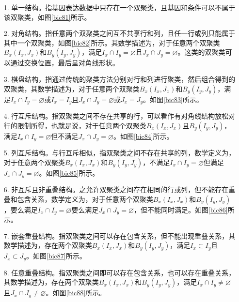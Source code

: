   \begin{enumerate}
    \item[1.] 单一结构。指基因表达数据中只存在一个双聚类，且基因和条件可以不属于该双聚类，如图\ref{bic81}所示。

    \item[2.] 对角结构。指任意两个双聚类之间互不共享行和列，且任一行或列只能属于其中一个双聚类，如图\ref{bic82}所示。其数学描述为，对于任意两个双聚类$B_x(I_x, J_x)$和$B_y(I_y, J_y)$，满足$I_x \cap I_y = \varnothing $且$J_x \cap J_y = \varnothing $。这类的双聚类可以通过交换位置，最后呈对角线形状。
    
    \item[3.] 棋盘结构，指通过传统的聚类方法分别对行和列进行聚类，然后组合得到的双聚类，其数学描述为，对于任意两个双聚类$B_x(I_x, J_x)$和$B_y(I_y, J_y)$，满足$I_x \cap I_y = \varnothing $或$I_x = I_y $且$J_x \cap J_y = \varnothing $或$J_x = J_y $。如图\ref{bic83}所示。
    
    \item[4.] 行互斥结构。指双聚类之间不存在共享的行，可以看作有对角线结构放松对行的限制所得，也就是说，对于任意两个双聚类$B_x(I_x, J_x)$且$B_y(I_y, J_y)$，满足$I_x \cap I_y = \varnothing $但不满足$J_x \cap J_y = \varnothing $。如图\ref{bic84}所示。
    
    \item[5.] 列互斥结构。与行互斥相似，指双聚类之间不存在共享的列，数学定义为，对于任意两个双聚类$B_x(I_x, J_x)$和$B_y(I_y, J_y)$，不满足$I_x \cap I_y = \varnothing $但满足$J_x \cap J_y = \varnothing $。如图\ref{bic85}所示。
    
    \item[6.] 非互斥且非重叠结构。之允许双聚类之间存在相同的行或列，但不能存在重叠和包含关系，数学定义为，对于任意两个双聚类$B_x(I_x, J_x)$和$B_y(I_y, J_y)$，要么满足$I_x \cap I_y = \varnothing $要么满足$J_x \cap J_y = \varnothing $，但不能同时满足。如图\ref{bic86}所示。
    
    \item[7.] 嵌套重叠结构。指双聚类之间可以存在包含关系，但不能出现重叠关系，其数学描述为，存在两个双聚类$B_x(I_x, J_x)$和$B_y(I_y, J_y)$，满足$I_x \subset I_y $且$J_x \subset J_y $。如图\ref{bic87}所示。
    
    \item[8.] 任意重叠结构。指双聚类之间即可以存在包含关系，也可以存在重叠关系，其数学描述为，存在两个双聚类$B_x(I_x, J_x)$和$B_y(I_y, J_y)$，满足$I_x \cap I_y \ne \varnothing $且$J_x \cap J_y \ne \varnothing $。如图\ref{bic88}所示。
  \end{enumerate}

